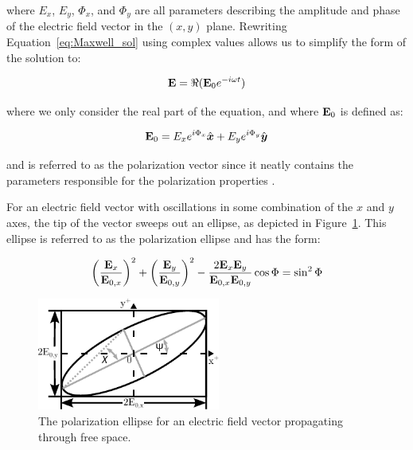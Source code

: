 \noindent where $E_{x}$, $E_{y}$, $\Phi_{x}$, and $\Phi_{y}$ are all parameters describing the amplitude and phase of the electric field vector in the $(x, y)$ plane. Rewriting Equation~\ref{eq:Maxwell_sol} using complex values allows us to simplify the form of the solution to:

\begin{equation}
  \mathbf{E} = \Re(\mathbf{E}_{0} e^{-i \omega t})
  \label{eq:E_field_vector}
\end{equation}

\noindent where we only consider the real part of the equation, and where $\mathbf{E}_{0}$ is defined as:

\begin{equation}
  \mathbf{E}_{0} = E_{x} e^{i \Phi_{x}} \hat{\boldsymbol{x}} +
  E_{y} e^{i \Phi_{y}} \hat{\boldsymbol{y}}
  \label{eq:pol_vector}
\end{equation}

\noindent and is referred to as the polarization vector since it neatly contains the parameters responsible for the polarization properties \citep{pol_phys}.
\prgph

For an electric field vector with oscillations in some combination of the $x$ and $y$ axes, the tip of the vector sweeps out an ellipse, as depicted in Figure~\ref{fig:pol_ellipse}. This ellipse is referred to as the polarization ellipse and has the form:

\begin{equation}
  \left( \frac{\mathbf{E}_{x}}{\mathbf{E}_{0, x}}\right)^{2} +
  \left( \frac{\mathbf{E}_{y}}{\mathbf{E}_{0, y}}\right)^{2} -
  \frac{2 \mathbf{E}_{x} \mathbf{E}_{y}}{\mathbf{E}_{0, x} \mathbf{E}_{0, y}} \cos\Phi =
  \sin^{2} \Phi
  \label{eq:pol_ellipse}
\end{equation}

\begin{figure}[t]
  \centering
  \includegraphics[width=6cm]{figures/2_pol_ellipse.pdf}
  \caption{The polarization ellipse for an electric field vector propagating through free space.}
  \label{fig:pol_ellipse}
\end{figure}

